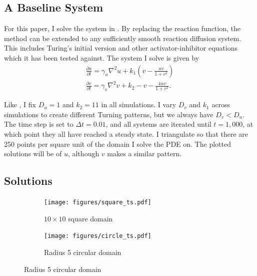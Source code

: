 \subsection{A Baseline System}

For this paper, I solve the system in \autocites{othmer2009intersection}{jeong2017numerical}. By replacing the reaction function, the method can be extended to any sufficiently smooth reaction diffusion system. This includes Turing's initial version \parencites{turing1990chemical}{de2020leopard} and other activator-inhibitor equations \parencites{landge2020pattern}{meinhardt2000pattern} which it has been tested against. The system I solve is given by
\begin{align*}
    \frac{\partial u}{\partial t} = \gamma_u \nabla^2 u + k_1 \left(v - \frac{uv}{1 + v^2}\right) \\
    \frac{\partial v}{\partial t} = \gamma_v \nabla^2 v + k_2 - v - \frac{4 u v}{1 + v^2}.
\end{align*}

Like \autocite{jeong2017numerical}, I fix $D_u = 1$ and $k_2 = 11$ in all simulations. I vary $D_v$ and $k_1$ across simulations to create different Turning patterns, but we always have $D_v< D_u$. The time step is set to $\Delta t = 0.01$, and all systems are iterated until $t = 1,000$, at which point they all have reached a steady state. I triangulate so that there are 250 points per square unit of the domain I solve the PDE on. The plotted solutions will be of $u$, although $v$ makes a similar pattern.


\subsection{Solutions}

\begin{figure}[t!]
    \centering
    \caption{Solutions to the reaction diffusion system}

    \begin{subfigure}{\textwidth}
        \centering
        \texttt{[image: figures/square\_ts.pdf]}
        \caption{$10 \times 10$ square domain}
    \end{subfigure}

    \begin{subfigure}{\textwidth}
        \centering
        \texttt{[image: figures/circle\_ts.pdf]}
        \caption{Radius 5 circular domain}
    \end{subfigure}
    \label{fig:sol-ts}
\end{figure}


